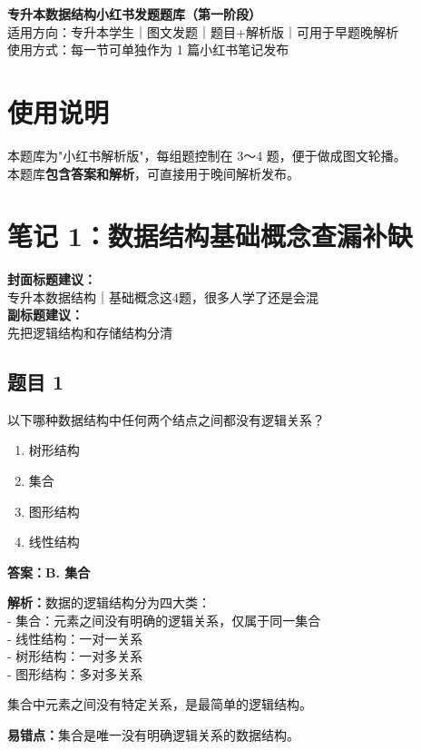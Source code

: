\documentclass[12pt,a4paper]{ctexart}
\begin{document}
\begin{center}
	{\LARGE \textbf{专升本数据结构小红书发题题库（第一阶段）}}\\[0.6em]
	{\large 适用方向：专升本学生｜图文发题｜题目+解析版｜可用于早题晚解析}\\[0.8em]
	{\normalsize 使用方式：每一节可单独作为 1 篇小红书笔记发布}
\end{center}

\vspace{1em}

\section*{使用说明}
本题库为"小红书解析版"，每组题控制在 3～4 题，便于做成图文轮播。\\
本题库\textbf{包含答案和解析}，可直接用于晚间解析发布。

\newpage

\section{笔记 1：数据结构基础概念查漏补缺}
\begin{coverbox}
	\textbf{封面标题建议：}\\
	专升本数据结构｜基础概念这4题，很多人学了还是会混\\
	\textbf{副标题建议：}\\
	先把逻辑结构和存储结构分清
\end{coverbox}

\subsection*{题目 1}
以下哪种数据结构中任何两个结点之间都没有逻辑关系？
\begin{enumerate}[label=\Alph*.]
	\item 树形结构
	\item 集合
	\item 图形结构
	\item 线性结构
\end{enumerate}

\begin{answerbox}
	\textbf{答案：B. 集合}

	\textbf{解析：}数据的逻辑结构分为四大类：\\
	- 集合：元素之间没有明确的逻辑关系，仅属于同一集合\\
	- 线性结构：一对一关系\\
	- 树形结构：一对多关系\\
	- 图形结构：多对多关系

	集合中元素之间没有特定关系，是最简单的逻辑结构。

	\textbf{易错点：}集合是唯一没有明确逻辑关系的数据结构。
\end{answerbox}
\end{document}
